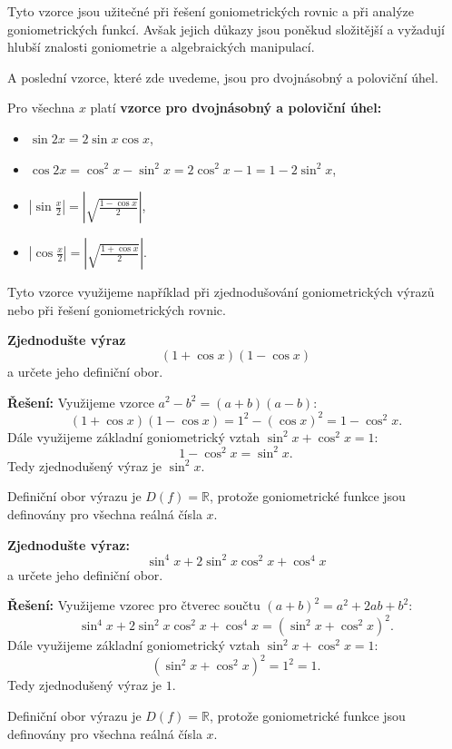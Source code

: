 \documentclass[12pt,a4paper]{article}
\begin{document}
Tyto vzorce jsou užitečné při řešení goniometrických rovnic a při analýze goniometrických funkcí. 
Avšak jejich důkazy jsou poněkud složitější a vyžadují hlubší znalosti goniometrie a algebraických manipulací.

A poslední vzorce, které zde uvedeme, jsou pro dvojnásobný a poloviční úhel.
\begin{definitionbox}
    Pro všechna $x$ platí \textbf{vzorce pro dvojnásobný a poloviční úhel:}
    \begin{itemize}
        \item $\sin 2x = 2 \sin x \cos x$,
        \item $\cos 2x = \cos^2 x - \sin^2 x = 2\cos^2 x - 1 = 1 - 2\sin^2 x$,
        \item $\left|\sin \frac{x}{2}\right| = \left|\sqrt{\frac{1 - \cos x}{2}}\right|$,
        \item $\left|\cos \frac{x}{2}\right| = \left|\sqrt{\frac{1 + \cos x}{2}}\right|$.
    \end{itemize}
\end{definitionbox}

Tyto vzorce využijeme například při zjednodušování goniometrických výrazů
nebo při řešení goniometrických rovnic.

\begin{examplebox}
    \textbf{Zjednodušte výraz}
    \[
    \left(1 + \cos x\right)\left(1 - \cos x\right)
    \]
    a určete jeho definiční obor.
    
    \medskip
    \textbf{Řešení:}
    Využijeme vzorce $a^2 - b^2 = (a+b)(a-b)$:
    \[
    \left(1 + \cos x\right)\left(1 - \cos x\right) = 1^2 - (\cos x)^2 = 1 - \cos^2 x.
    \]
    Dále využijeme základní goniometrický vztah $\sin^2 x + \cos^2 x = 1$:
    \[
    1 - \cos^2 x = \sin^2 x.
    \]
    Tedy zjednodušený výraz je $\sin^2 x$.

    \medskip
    Definiční obor výrazu je $D(f)=\mathbb{R}$, protože goniometrické funkce jsou definovány pro všechna reálná čísla $x$.
\end{examplebox}

\begin{examplebox}
    \textbf{Zjednodušte výraz:}
    \[
    \sin^4 x + 2\sin^2 x \cos^2 x + \cos^4 x
    \]
    a určete jeho definiční obor.

    \medskip
    \textbf{Řešení:}
    Využijeme vzorec pro čtverec součtu $(a+b)^2 = a^2 + 2ab + b^2$:
    \[
    \sin^4 x + 2\sin^2 x \cos^2 x + \cos^4 x = (\sin^2 x + \cos^2 x)^2.
    \]
    Dále využijeme základní goniometrický vztah $\sin^2 x + \cos^2 x = 1$:
    \[
    (\sin^2 x + \cos^2 x)^2 = 1^2 = 1.
    \]
    Tedy zjednodušený výraz je $1$.

    \medskip
    Definiční obor výrazu je $D(f)=\mathbb{R}$, protože goniometrické funkce jsou definovány pro všechna reálná čísla $x$.
\end{examplebox}
\end{document}
